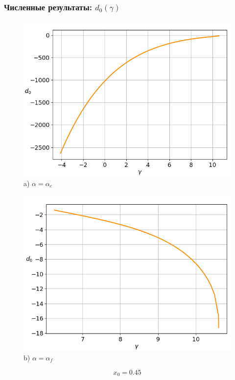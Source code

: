 \documentclass[fullscreen=true, unicode, bookmarks=false]{beamer}
\begin{document}
\begin{frame}
\frametitle{ Численные результаты: $ d_0(\gamma) $ }

\begin{figure} 
\begin{minipage}[h]{0.49\linewidth}
\begin{center}
\includegraphics[scale=0.32]{oscillating_d0_x0_045.png} \\ {\scriptsize a) $ \alpha = \alpha_c $}
\end{center}
\end{minipage} 
\hfill
\begin{minipage}[h]{0.49\linewidth}
\begin{center}
\includegraphics[scale=0.32]{oscillating_d0_after_tangent_x0_045.png}  \\ {\scriptsize b) $ \alpha = \alpha_f $}
\end{center}
\end{minipage} 
\end{figure}

$$ x_0 = 0.45 $$

\end{frame}
\end{document}
